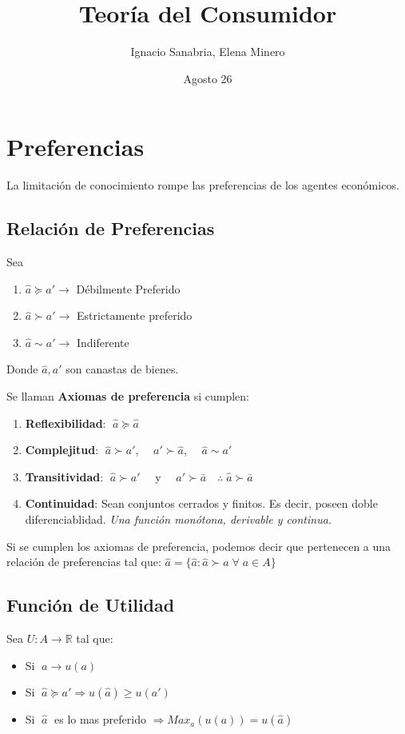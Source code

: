 \documentclass{article}
\title{Teoría del Consumidor}
\author{Ignacio Sanabria, Elena Minero}
\date{Agosto 26}
\begin{document}
    \maketitle
\section{Preferencias}
La limitación de conocimiento rompe las preferencias de los agentes económicos. 
\subsection{Relación de Preferencias}
Sea 
\begin{enumerate}
    \item $\hat{a}\succeq a'\xrightarrow{}$ Débilmente Preferido 
    \item $\hat{a}\succ a'\xrightarrow{}$ Estrictamente preferido
    \item $\hat{a}\sim a'\xrightarrow{}$ Indiferente
\end{enumerate}
Donde $\hat{a},a'$ son canastas de bienes.

Se llaman \textbf{Axiomas de preferencia} si cumplen:
\begin{enumerate}
    \item \textbf{Reflexibilidad}: $\;\hat{a}\succeq \hat{a}$
    \item \textbf{Complejitud}: $\;\hat{a}\succ a'$,  $\quad a'\succ \hat{a}$, $\quad\hat{a}\sim a'$
    \item \textbf{Transitividad}: $\; \hat{a}\succ a' \quad$ y $\quad a'\succ \bar{a} \quad \therefore\;\hat{a} \succ \bar{a}$ 
    \item \textbf{Continuidad}: Sean conjuntos cerrados y finitos. Es decir, poseen doble diferenciablidad. \textit{Una función monótona, derivable y continua.}
\end{enumerate}

Si se cumplen los axiomas de preferencia, podemos decir que pertenecen a una relación de preferencias tal que: $\hat{a}=\{\hat{a}:\hat{a}\succ a\; \forall \;a \in A \}$

\subsection{Función de Utilidad}
Sea $U:A\xrightarrow{}\mathbb{R}$ tal que:
\begin{itemize}
    \item Si $\; a\xrightarrow{} u(a)$
    \item Si $\; \hat{a} \succeq a' \Rightarrow u(\hat{a}) \geq u(a')$
    \item Si $\; \hat{a}\;$ es lo mas preferido $\Rightarrow Max_a(u(a))=u(\hat{a})$
\end{itemize} 
\end{document}
